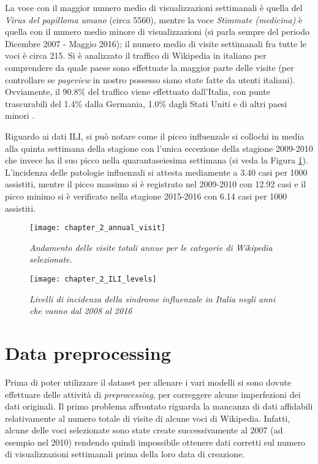 La voce con il maggior numero medio di visualizzazioni settimanali è quella del \textit{Virus del papilloma umano} (circa 
5560), mentre la voce \textit{Stimmate (medicina)} è quella con il numero medio minore di visualizzazioni (si parla sempre 
del periodo Dicembre 2007 - Maggio 2016); il numero medio di visite settimanali fra tutte le voci è circa 215. 
Si è analizzato il traffico di Wikipedia in italiano per comprendere da quale paese sono effettuate la maggior parte 
delle visite (per controllare se \textit{pageview} in nostro possesso siano state fatte da utenti italiani). 
Ovviamente, il 90.8\% del traffico viene effettuato dall'Italia, con punte trascurabili del 1.4\% dalla Germania, 1.0\% dagli 
Stati Uniti e di altri paesi minori \cite{WikipediaStatsCountry}.
\bigskip

Riguardo ai dati ILI, si può notare come il picco influenzale si collochi in media alla quinta settimana della stagione con 
l'unica eccezione della stagione 2009-2010 che invece ha il suo picco nella quarantaseiesima settimana (si veda la 
Figura \ref{fig:ch_2_ILI_levels}). L'incidenza delle patologie influenzali si attesta mediamente a 3.40 casi per 1000 
assistiti, mentre il picco massimo si è registrato nel 2009-2010 con 12.92 casi e il picco minimo si è verificato nella 
stagione 2015-2016 con 6.14 casi per 1000 assistiti.
\bigskip

\begin{figure}[h!]

\texttt{[image: chapter\_2\_annual\_visit]}
\caption{\textit{Andamento delle visite totali annue per le categorie di Wikipedia selezionate.}}
\label{fig:ch_2_annual_visit}


\texttt{[image: chapter\_2\_ILI\_levels]}
\caption{\textit{Livelli di incidenza della sindrome influenzale in Italia negli anni che vanno dal 2008 al 2016}}
\label{fig:ch_2_ILI_levels}

\centering

\end{figure}
\bigskip

\section{Data preprocessing}
\bigskip

Prima di poter utilizzare il dataset per allenare i vari modelli si sono dovute effettuare delle attività di 
\textit{preprocessing}, per correggere alcune imperfezioni dei dati originali. Il primo problema affrontato riguarda la mancanza di dati affidabili relativamente al numero totale di visite di alcune voci di Wikipedia.
Infatti, alcune delle voci selezionate sono state create successivamente al 2007 (ad esempio nel 2010) rendendo quindi 
impossibile ottenere dati corretti sul numero di visualizzazioni settimanali prima della loro data di creazione. 
\bigskip

